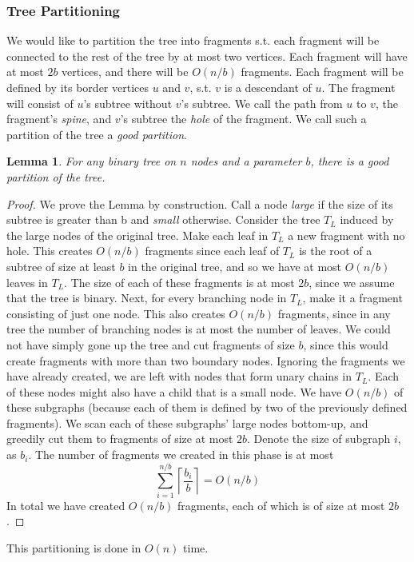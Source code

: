 \documentclass[11pt,a4paper]{article}
\newtheorem{lemma}{Lemma}
\theoremstyle{definition}
\theoremstyle{remark}
\begin{document}
\subsubsection{Tree Partitioning}\label{tree partitioning}
We would like to partition the tree into fragments s.t. each fragment will be connected to the rest of the tree by at most two vertices. Each fragment will have at most $2b$ vertices, and there will be $O(n/b)$ fragments. Each fragment will be defined by its border vertices $u$ and $v$, s.t. $v$ is a descendant of $u$. The fragment will consist of $u$'s subtree without $v$'s subtree. We call the path from $u$ to $v$, the fragment's \textit{spine}, and $v$'s subtree the \textit{hole} of the fragment. We call such a partition of the tree a \emph{good partition}.
\begin{lemma}\label{basic partitioning lemma}
For any binary tree on $n$ nodes and a parameter $b$, there is a good partition of the tree.
\end{lemma}
\begin{proof}
We prove the Lemma by construction. Call a node \textit{large} if the size of its subtree is greater than b and \textit{small} otherwise. Consider the tree $T_L$ induced by the large nodes of the original tree. Make each leaf in $T_L$ a new fragment with no hole. This creates $O(n/b)$ fragments since each leaf of $T_L$ is the root of a subtree of size at least $b$ in the original tree, and so we have at most $O(n/b)$ leaves in $T_L$. The size of each of these fragments is at most $2b$, since we assume that the tree is binary. Next, for every branching node in $T_L$, make it a fragment consisting of just one node. This also creates $O(n/b)$ fragments, since in any tree the number of branching nodes is at most the number of leaves. We could not have simply gone up the tree and cut fragments of size $b$, since this would create fragments with more than two boundary nodes. Ignoring the fragments we have already created, we are left with nodes that form unary chains in $T_L$. Each of these nodes might also have a child that is a small node. We have $O(n/b)$ of these subgraphs (because each of them is defined by two of the previously defined fragments). We scan each of these subgraphs' large nodes bottom-up, and greedily cut them to fragments of size at most $2b$. Denote the size of subgraph $i$, as $b_i$. The number of fragments we created in this phase is at most $$\sum_{i=1}^{n/b} \left\lceil \frac{b_i}{b} \right\rceil = O(n/b)$$
In total we have created $O(n/b)$ fragments, each of which is of size at most $2b$.
\end{proof}
This partitioning is done in $O(n)$ time.
\end{document}
